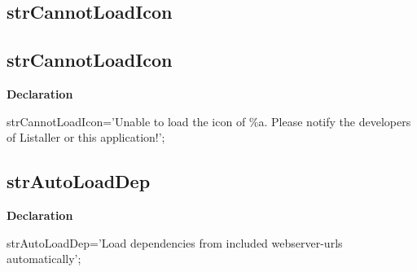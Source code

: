\documentclass{report}
\newif\ifpdf
\begin{document}
\subsection*{\large{\textbf{strCannotLoadIcon}}\normalsize\hspace{1ex}\hrulefill}
\else
\subsection*{strCannotLoadIcon}
\fi
\label{trstrings-strCannotLoadIcon}
\begin{list}{}{
\setlength{\itemindent}{0cm}
\setlength{\listparindent}{0cm}
\setlength{\leftmargin}{\evensidemargin}
\addtolength{\leftmargin}{\tmplength}
\settowidth{\labelsep}{X}
\addtolength{\leftmargin}{\labelsep}
\setlength{\labelwidth}{\tmplength}
}
\item[\textbf{Declaration}\hfill]
\ifpdf
\begin{flushleft}
\fi
\begin{ttfamily}
strCannotLoadIcon='Unable to load the icon of {\%}a. Please notify the developers of Listaller or this application!';\end{ttfamily}

\ifpdf
\end{flushleft}
\fi

\end{list}
\ifpdf
\subsection*{\large{\textbf{strAutoLoadDep}}\normalsize\hspace{1ex}\hrulefill}
\else
\subsection*{strAutoLoadDep}
\fi
\label{trstrings-strAutoLoadDep}
\begin{list}{}{
\setlength{\itemindent}{0cm}
\setlength{\listparindent}{0cm}
\setlength{\leftmargin}{\evensidemargin}
\addtolength{\leftmargin}{\tmplength}
\settowidth{\labelsep}{X}
\addtolength{\leftmargin}{\labelsep}
\setlength{\labelwidth}{\tmplength}
}
\item[\textbf{Declaration}\hfill]
\ifpdf
\begin{flushleft}
\fi
\begin{ttfamily}
strAutoLoadDep='Load dependencies from included webserver-urls automatically';\end{ttfamily}

\ifpdf
\end{flushleft}
\fi

\end{list}
\ifpdf
\end{document}
